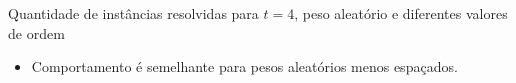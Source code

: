 \documentclass[dvipsnames]{beamer}
\begin{document}
\begin{frame}{Quantidade de instâncias resolvidas para $t = 4$, peso aleatório e diferentes valores de ordem}
\begin{figure}%
    \centering
    \caption{}%
    \label{fig:tree_sf4_s20_50_random}%
\end{figure}

\begin{itemize}
  \item Comportamento é semelhante para pesos aleatórios menos espaçados.
  \end{itemize}
\end{frame}
\end{document}
